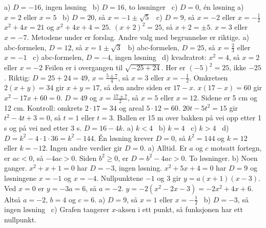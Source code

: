  a) $D = -16$, ingen løsning \ b) $D = 16$, to løsninger \ c) $D = 0$, én løsning
 a) $x = 2$ eller $x = 5$ \ b) $D = 20$, så $x = -1 \pm \sqrt{5}$ \ c) $D = 9$, så $x = -2$ eller $x = -\frac{1}{2}$
 $x^2 + 4x = 21$ og $x^2 + 4x + 4 = 25$. $(x+2)^2 = 25$, så $x + 2 = \pm 5$. $x = 3$ eller $x = -7$.
 Metodene under er forslag. Andre valg med begrunnelse er riktige. a) abc-formelen, $D = 12$, så $x = 1 \pm \sqrt{3}$ \ b) abc-formelen, $D = 25$, så $x = \frac{2}{3}$ eller $x = -1$ \
c) abc-formelen, $D = -4$, ingen løsning \ d) kvadratrot: $x^2 = 4$, så $x = 2$ eller $x = -2$
\fo{2.5} Feilen er i overgangen til $\sqrt{-25 + 24}$. Her er $(-5)^2 = 25$, ikke $-25$.
Riktig: $D = 25 + 24 = 49$, $x = \frac{5 \pm 7}{4}$, så $x = 3$ eller $x = -\frac{1}{2}$.
\fo{2.6} Omkretsen $2(x + y) = 34$ gir $x + y = 17$, så den andre siden er $17 - x$.
$x(17 - x) = 60$ gir $x^2 - 17x + 60 = 0$. $D = 49$ og $x = \frac{17 \pm 7}{2}$, så $x = 5$ eller $x = 12$.
Sidene er 5 cm og 12 cm. Kontroll: omkrets $2 \cdot 17 = 34$ og areal $5 \cdot 12 = 60$.
\fo{2.7} $20t - 5t^2 = 15$ gir $t^2 - 4t + 3 = 0$, så $t = 1$ eller $t = 3$.
Ballen er 15 m over bakken på vei opp etter 1 s og på vei ned etter 3 s.
\fo{2.8} $D = 16 - 4k$. a) $k < 4$ \ b) $k = 4$ \ c) $k > 4$ \
d) $D = k^2 - 4 \cdot 1 \cdot 36 = k^2 - 144$. Én løsning krever $D = 0$, så $k^2 = 144$ og $k = 12$ eller $k = -12$. Ingen andre verdier gir $D = 0$.
\fo{2.9} a) Alltid. Er $a$ og $c$ motsatt fortegn, er $ac < 0$, så $-4ac > 0$. Siden $b^2 \ge 0$, er $D = b^2 - 4ac > 0$. To løsninger.
b) Noen ganger. $x^2 + x + 1 = 0$ har $D = -3$, ingen løsning. $x^2 + 5x + 4 = 0$ har $D = 9$ og løsningene $x = -1$ og $x = -4$.
\fo{2.10} Nullpunktene $-1$ og $3$ gir $y = a(x+1)(x-3)$. Ved $x = 0$ er $y = -3a = 6$, så $a = -2$.
$y = -2(x^2 - 2x - 3) = -2x^2 + 4x + 6$. Altså $a = -2$, $b = 4$ og $c = 6$.
\fo{Sjekk 2} a) $D = 9$, så $x = 1$ eller $x = -\frac{1}{2}$ \ b) $D = -3$, så ingen løsning \
c) Grafen tangerer $x$-aksen i ett punkt, så funksjonen har ett nullpunkt.

